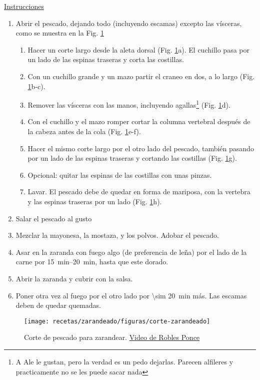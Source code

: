 \underline{Instrucciones}
\begin{enumerate}
\item Abrir el pescado, dejando todo (incluyendo escamas) excepto las vísceras, como se muestra en la Fig. \ref{fig:corte-zarandeado}
\begin{enumerate}
\item Hacer un corte largo desde la aleta dorsal (Fig. \ref{fig:corte-zarandeado}a). El cuchillo pasa por un lado de las espinas traseras y corta las costillas.
\item Con un cuchillo grande y un mazo partir el craneo en dos, a lo largo (Fig. \ref{fig:corte-zarandeado}b-c).
\item Remover las vísceras con las manos, incluyendo agallas\footnote{A Ale le gustan, pero la verdad es un pedo dejarlas. Parecen alfileres y practicamente no se les puede sacar nada} (Fig. \ref{fig:corte-zarandeado}d).
\item Con el cuchillo y el mazo romper cortar la columna vertebral después de la cabeza antes de la cola (Fig. \ref{fig:corte-zarandeado}e-f).
\item Hacer el mismo corte largo por el otro lado del pescado, también pasando por un lado de las espinas traseras y cortando las costillas (Fig. \ref{fig:corte-zarandeado}g).
\item Opcional: quitar las espinas de las costillas con unas pinzas.
\item Lavar. El pescado debe de quedar en forma de mariposa, con la vertebra y las espinas traseras por un lado (Fig. \ref{fig:corte-zarandeado}h).
\end{enumerate}
\item Salar el pescado al gusto
\item Mezclar la mayonesa, la mostaza, y los polvos. Adobar el pescado.
\item Asar en la zaranda con fuego algo (de preferencia de leña) por el lado de la carne por \SIrange{15}{20}{min}, hasta que este dorado.
\item Abrir la zaranda y cubrir con la salsa.
\item Poner otra vez al fuego por el otro lado por \SI{\sim 20}{min} más. Las escamas deben de quedar quemadas.
\end{enumerate}

\begin{figure}
\texttt{[image: recetas/zarandeado/figuras/corte-zarandeado]}
\caption{Corte de pescado para zarandear. \href{https://www.youtube.com/watch?v=_OmdFQWyWRc}{Video de Robles Ponce}}
\label{fig:corte-zarandeado}
\end{figure}